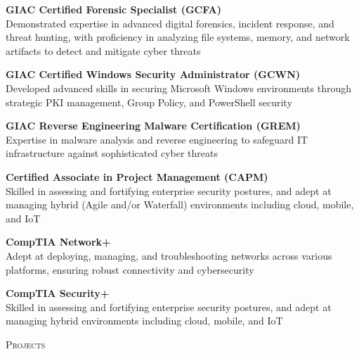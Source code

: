 \documentclass[a4paper]{article}
\newcommand{\lineunder} {
        \vspace*{-8pt} \\
        \hspace*{-18pt} \hrulefill \\
    }
\newcommand{\header} [1] {
        {\hspace*{-18pt}\vspace*{6pt} \textsc{#1}}
        \vspace*{-6pt} \lineunder
    }
\begin{document}
            {\textbf{GIAC Certified Forensic Specialist (GCFA)}}\\
            Demonstrated expertise in advanced digital forensics, incident response, and threat hunting, with proficiency in analyzing file systems, memory, and network artifacts to detect and mitigate cyber threats\\
            \vspace*{2mm}
            
            {\textbf{GIAC Certified Windows Security Administrator (GCWN)}}\\
            Developed advanced skills in securing Microsoft Windows environments through strategic PKI management, Group Policy, and PowerShell security\\
            \vspace*{2mm}
            
            {\textbf{GIAC Reverse Engineering Malware Certification (GREM)}}\\
            Expertise in malware analysis and reverse engineering to safeguard IT infrastructure against sophisticated cyber threats\\
            \vspace*{2mm}
            
            {\textbf{Certified Associate in Project Management (CAPM)}}\\
            Skilled in assessing and fortifying enterprise security postures, and adept at managing hybrid (Agile and/or Waterfall) environments including cloud, mobile, and IoT\\
            \vspace*{2mm}
            
            {\textbf{CompTIA Network+}}\\
            Adept at deploying, managing, and troubleshooting networks across various platforms, ensuring robust connectivity and cybersecurity\\
            \vspace*{2mm}
            
            {\textbf{CompTIA Security+}}\\
            Skilled in assessing and fortifying enterprise security postures, and adept at managing hybrid environments including cloud, mobile, and IoT\\
            \vspace*{2mm}
            

\header{Projects}
\end{document}

